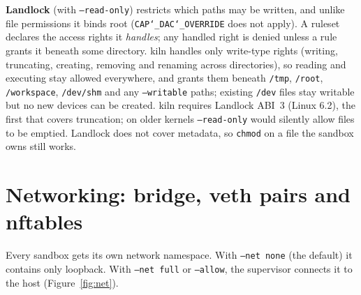 \documentclass[10pt,letterpaper]{article}
\newcommand{\code}[1]{\texttt{#1}}
\newcommand{\us}{\char`\_}
\begin{document}
\textbf{Landlock} (with \code{--read-only}) restricts which paths may be written,
and unlike file permissions it binds root (\code{CAP\us{}DAC\us{}OVERRIDE} does not
apply). A ruleset declares the access rights it \emph{handles}; any handled right
is denied unless a rule grants it beneath some directory. kiln handles only
write-type rights (writing, truncating, creating, removing and renaming across
directories), so reading and executing stay allowed everywhere, and grants them
beneath \code{/tmp}, \code{/root}, \code{/workspace}, \code{/dev/shm} and any
\code{--writable} paths; existing \code{/dev} files stay writable but no new
devices can be created. kiln requires Landlock ABI~3 (Linux 6.2), the first that
covers truncation; on older kernels \code{--read-only} would silently allow files
to be emptied. Landlock does not cover metadata, so \code{chmod} on a file the
sandbox owns still works.

\section{Networking: bridge, veth pairs and nftables}
\label{sec:net}

Every sandbox gets its own network namespace. With \code{--net none} (the
default) it contains only loopback. With \code{--net full} or \code{--allow}, the
supervisor connects it to the host (Figure~\ref{fig:net}).
\end{document}

